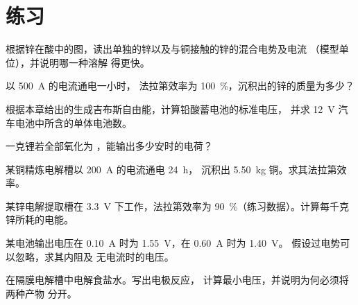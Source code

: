 \section{练习}

\begin{exercise}[$\star$]\label{exo:b2:batteries-electrolysis:1}
根据锌在酸中的图，读出单独的锌以及与铜接触的锌的混合电势及电流
（模型单位），并说明哪一种溶解
得更快。
\end{exercise}

\begin{exercise}[$\star$]\label{exo:b2:batteries-electrolysis:2}
以 \qty{500}{A} 的电流通电一小时，
法拉第效率为 100~\%，沉积出的锌的质量为多少？
\end{exercise}

\begin{exercise}[$\star$]\label{exo:b2:batteries-electrolysis:3}
根据本章给出的生成吉布斯自由能，计算铅酸蓄电池的标准电压，
并求
\qty{12}{V} 汽车电池中所含的单体电池数。
\end{exercise}

\begin{exercise}[$\star$]\label{exo:b2:batteries-electrolysis:4}
一克锂若全部氧化为
，能输出多少安时的电荷？
\end{exercise}

\begin{exercise}[$\star\star$]\label{exo:b2:batteries-electrolysis:5}
某铜精炼电解槽以 \qty{200}{A} 的电流通电 \qty{24}{h}，
沉积出 \qty{5.50}{kg} 铜。求其法拉第效率。
\end{exercise}

\begin{exercise}[$\star\star$]\label{exo:b2:batteries-electrolysis:6}
某锌电解提取槽在 \qty{3.3}{V} 下工作，法拉第效率为
90~\%（练习数据）。计算每千克锌所耗的电能。
\end{exercise}

\begin{exercise}[$\star\star$]\label{exo:b2:batteries-electrolysis:7}
某电池输出电压在 \qty{0.10}{A} 时为 \qty{1.55}{V}，在 \qty{0.60}{A} 时为 \qty{1.40}{V}。
假设过电势可以忽略，求其内阻及
无电流时的电压。
\end{exercise}

\begin{exercise}[$\star\star$]\label{exo:b2:batteries-electrolysis:8}
在隔膜电解槽中电解食盐水。写出电极反应，
计算最小电压，并说明为何必须将两种产物
分开。
\end{exercise}

